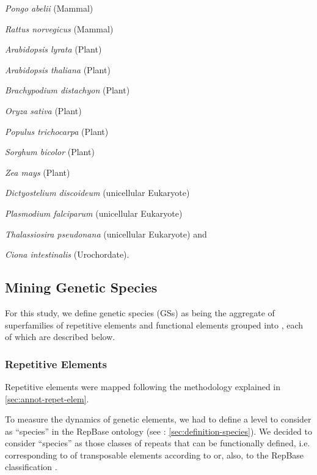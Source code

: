 \begin{inparaenum}[\bgroup\bfseries\em 1\egroup\it)]
\item \textit{Pongo abelii}             (Mammal)
\item \textit{Rattus norvegicus}        (Mammal)
\item \textit{Arabidopsis lyrata}       (Plant)
\item \textit{Arabidopsis thaliana}     (Plant)
\item \textit{Brachypodium distachyon}  (Plant)
\item \textit{Oryza sativa}             (Plant)
\item \textit{Populus trichocarpa}      (Plant)
\item \textit{Sorghum bicolor}          (Plant)
\item \textit{Zea mays}                 (Plant)
\item \textit{Dictyostelium discoideum} (unicellular Eukaryote)
\item \textit{Plasmodium falciparum}    (unicellular Eukaryote)
\item \textit{Thalassiosira pseudonana} (unicellular Eukaryote)
and \item \textit{Ciona intestinalis}   (Urochordate).
\end{inparaenum}

\subsection{Mining Genetic Species}
\label{sec:mining-genet-elem}

For this study, we define genetic species (GSs) as being the aggregate of superfamilies of repetitive elements and functional elements grouped into , each of which are described below.

\subsubsection{Repetitive Elements}
\label{sec:repetitive-elements}

Repetitive elements were mapped following the methodology explained in \autoref{sec:annot-repet-elem}.

To measure the dynamics of genetic elements, we had to define a level to consider as ``species'' in the RepBase ontology (see : \autoref{sec:definition-species}). We decided to consider ``species'' as those classes of repeats that can be functionally defined, i.e. corresponding to  of transposable elements according to \cite{Wicker2007} or, also, to the RepBase classification \cite{Kapitonov2008}.

